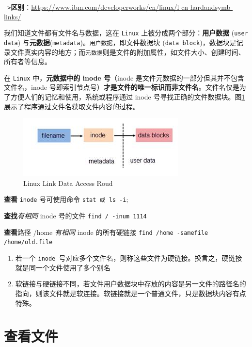 \documentclass[UTF8,a4paper,12pt]{ctexbook}
\begin{document}
			\verb|->|\textbf{区别}：\url{https://www.ibm.com/developerworks/cn/linux/l-cn-hardandsymb-links/}
			
			我们知道文件都有文件名与数据，这在 \verb|Linux| 上被分成两个部分：\textbf{用户数据} (\verb|user data|) 与\textbf{元数据}(\verb|metadata|)。\verb|用户数据|，即文件数据块 (\verb|data block|)，数据块是记录文件真实内容的地方；而\verb|元数据|则是文件的附加属性，如文件大小、创建时间、所有者等信息。
			
			在 \verb|Linux| 中，\textbf{元数据中的 inode 号}（inode 是文件元数据的一部分但其并不包含文件名，inode 号即索引节点号）\textbf{才是文件的唯一标识而非文件名}。文件名仅是为了方便人们的记忆和使用，系统或程序通过 inode 号寻找正确的文件数据块。图\ref{Link}展示了程序通过文件名获取文件内容的过程。
			
			\begin{figure}
				\centering
				\includegraphics[scale = 1.2]{figure/Link.jpg}	
				\caption{Linux Link Data Access Roud}
				\label{Link}
			\end{figure}
			
			\textbf{查看} \verb|inode| 号可使用命令 \verb|stat 或 ls -i|;
			
			\textbf{查找}\textit{有相同} inode 号的文件 \verb|find / -inum 1114|
			
			\textbf{查看}路径 /home \textit{有相同} inode 的所有硬链接 \verb|find /home -samefile /home/old.file |
			
			\begin{enumerate}
				\item 若一个 \verb|inode |号对应多个文件名，则称这些文件为硬链接。换言之，硬链接就是同一个文件使用了多个别名
				
				\item 软链接与硬链接不同，若文件用户数据块中存放的内容是另一文件的路径名的指向，则该文件就是软连接。软链接就是一个普通文件，只是数据块内容有点特殊。
			\end{enumerate}
			
		
	\section{查看文件}
\end{document}
